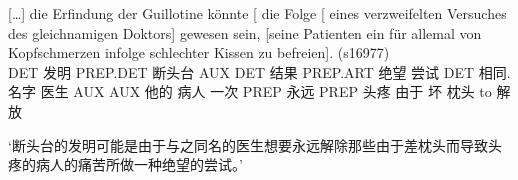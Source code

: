 \ex 
{\raggedright
\gll {}[\ldots] die Erfindung der Guillotine könnte [ die Folge [ eines verzweifelten
    Versuches des gleichnamigen Doktors] gewesen sein, [seine Patienten ein für allemal von
    Kopfschmerzen infolge schlechter Kissen zu befreien]. (s16977)\\
    {}  DET 发明 PREP.DET 断头台 AUX {} DET 结果 {} PREP.ART 绝望 尝试 DET 相同.名字 医生 AUX AUX \spacebr{}他的 病人
一次 PREP 永远 PREP 头疼 由于 坏 枕头 to 解放\\
\par}
\glt `断头台的发明可能是由于与之同名的医生想要永远解除那些由于差枕头而导致头疼的病人的痛苦所做一种绝望的尝试。'
\zl

